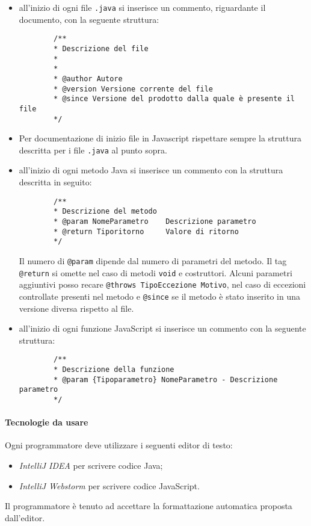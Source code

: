 	\begin{itemize}
		\item all'inizio di ogni file \texttt{.java} si inserisce un commento, riguardante il documento, con la seguente struttura:
		\begin{verbatim}
		/**
		* Descrizione del file
		*
		*
		* @author Autore
		* @version Versione corrente del file
		* @since Versione del prodotto dalla quale è presente il file
		*/
		\end{verbatim}
		\item Per documentazione di inizio file in Javascript rispettare sempre la struttura descritta per i file \texttt{.java} al punto sopra.
		\item all'inizio di ogni metodo Java si inserisce un commento con la struttura descritta in seguito:
		\begin{verbatim}
		/** 
		* Descrizione del metodo
		* @param NomeParametro    Descrizione parametro
		* @return Tiporitorno     Valore di ritorno 
		*/
		\end{verbatim}
		Il numero di \texttt{@param} dipende dal numero di parametri del metodo. Il tag \texttt{@return} si omette nel caso di metodi \texttt{void} e costruttori. Alcuni parametri aggiuntivi posso recare \texttt{@throws TipoEccezione Motivo}, nel caso di eccezioni controllate presenti nel metodo e \texttt{@since} se il metodo è stato inserito in una versione diversa rispetto al file.
		\item all'inizio di ogni funzione JavaScript si inserisce un commento con la seguente struttura:
		\begin{verbatim}
		/** 
		* Descrizione della funzione
		* @param {Tipoparametro} NomeParametro - Descrizione parametro
		*/
		\end{verbatim}
	\end{itemize}
	
	\paragraph{Tecnologie da usare}
	Ogni programmatore deve utilizzare i seguenti editor di testo:
	\begin{itemize}
		\item \emph{IntelliJ IDEA} per scrivere codice Java;
		\item \emph{IntelliJ Webstorm} per scrivere codice JavaScript.
	\end{itemize}
	Il programmatore è tenuto ad accettare la formattazione automatica proposta dall'editor.

